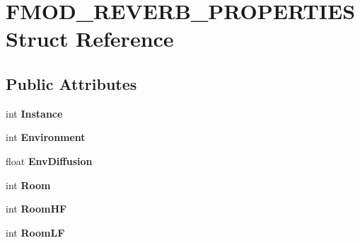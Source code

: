 \hypertarget{struct_f_m_o_d___r_e_v_e_r_b___p_r_o_p_e_r_t_i_e_s}{\section{F\-M\-O\-D\-\_\-\-R\-E\-V\-E\-R\-B\-\_\-\-P\-R\-O\-P\-E\-R\-T\-I\-E\-S Struct Reference}
\label{struct_f_m_o_d___r_e_v_e_r_b___p_r_o_p_e_r_t_i_e_s}
}
\subsection*{Public Attributes}
\begin{DoxyCompactItemize}
\item 
\hypertarget{struct_f_m_o_d___r_e_v_e_r_b___p_r_o_p_e_r_t_i_e_s_a41962641b26cd664ebe99b94a601e415}{int {\bfseries Instance}}\label{struct_f_m_o_d___r_e_v_e_r_b___p_r_o_p_e_r_t_i_e_s_a41962641b26cd664ebe99b94a601e415}

\item 
\hypertarget{struct_f_m_o_d___r_e_v_e_r_b___p_r_o_p_e_r_t_i_e_s_afae3003d52d86bd18cdc1621311f9196}{int {\bfseries Environment}}\label{struct_f_m_o_d___r_e_v_e_r_b___p_r_o_p_e_r_t_i_e_s_afae3003d52d86bd18cdc1621311f9196}

\item 
\hypertarget{struct_f_m_o_d___r_e_v_e_r_b___p_r_o_p_e_r_t_i_e_s_a694e98175479b3a7ff88b7cfb68f32f0}{float {\bfseries Env\-Diffusion}}\label{struct_f_m_o_d___r_e_v_e_r_b___p_r_o_p_e_r_t_i_e_s_a694e98175479b3a7ff88b7cfb68f32f0}

\item 
\hypertarget{struct_f_m_o_d___r_e_v_e_r_b___p_r_o_p_e_r_t_i_e_s_aff2c5393b06ec1238cc8595d9b25d881}{int {\bfseries Room}}\label{struct_f_m_o_d___r_e_v_e_r_b___p_r_o_p_e_r_t_i_e_s_aff2c5393b06ec1238cc8595d9b25d881}

\item 
\hypertarget{struct_f_m_o_d___r_e_v_e_r_b___p_r_o_p_e_r_t_i_e_s_ae4a836dcc26f48773d51c6e40db286a4}{int {\bfseries Room\-H\-F}}\label{struct_f_m_o_d___r_e_v_e_r_b___p_r_o_p_e_r_t_i_e_s_ae4a836dcc26f48773d51c6e40db286a4}

\item 
\hypertarget{struct_f_m_o_d___r_e_v_e_r_b___p_r_o_p_e_r_t_i_e_s_ae07d419ed7e08ea376081b59798f7b1c}{int {\bfseries Room\-L\-F}}\label{struct_f_m_o_d___r_e_v_e_r_b___p_r_o_p_e_r_t_i_e_s_ae07d419ed7e08ea376081b59798f7b1c}


\end{DoxyCompactItemize}
